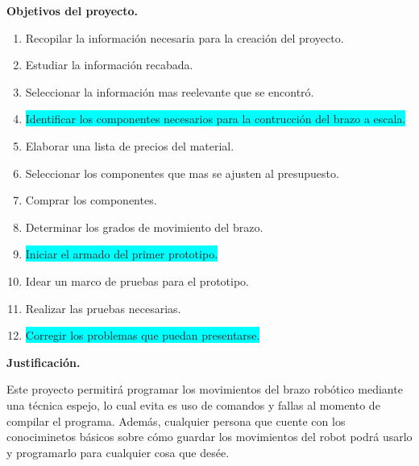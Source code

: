 \documentclass[letterpaper]{article}
\begin{document}
\begin{large}
    \begin{LARGE}
        \textbf{Objetivos del proyecto.}\\
    \end{LARGE}
    \begin{enumerate} 
        \item Recopilar la información necesaria para la creación del proyecto.
        \item Estudiar la información recabada.
        \item Seleccionar la información mas reelevante que se encontró.
        \item \colorbox{cyan}{Identificar los componentes necesarios para la contrucción del brazo a escala.} 
        \item Elaborar una lista de precios del material.
        \item Seleccionar los componentes que mas se ajusten al presupuesto.
        \item Comprar los componentes.
        \item Determinar los grados de movimiento del brazo.
        \item \colorbox{cyan}{Iniciar el armado del primer prototipo.}
        \item Idear un marco de pruebas para el prototipo.
        \item Realizar las pruebas necesarias.
        \item \colorbox{cyan}{Corregir los problemas que puedan presentarse.}
    \end{enumerate}
\end{large}
\vspace{1.5cm}
\begin{large}
    \begin{LARGE}
        \textbf{Justificación.}\\
    \end{LARGE}
Este proyecto permitirá programar los movimientos del brazo robótico mediante una técnica espejo, lo cual evita es uso de comandos y fallas al momento de compilar el programa. Además, cualquier persona que cuente con los conociminetos básicos sobre cómo guardar los movimientos del robot podrá usarlo y programarlo para cualquier cosa que desée. 
\end{large}
\end{document}
